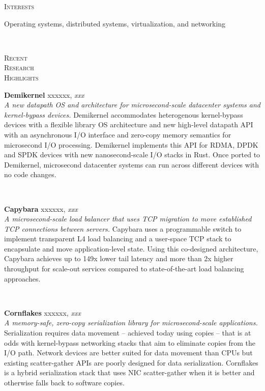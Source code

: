 \documentclass[10pt,times]{report}
\newlength{\sectiongap}
\newlength{\entrygap}
\newlength{\sectioncolwidth}
\newlength{\colgap}
\newlength{\stuffwidth}
\def\ifEqString#1#2{\def\testa{#1}\def\testb{#2}%
  \ifx\testa\testb}
\newenvironment{rtable}{
  \begin{minipage}{\textwidth}
  }{
  \end{minipage}
}
\newenvironment{rentry}[3][xxx]{
  \begin{minipage}[t]{\hsize}
    \textbf{#2}\ifEqString{#1}{xxx}\relax\else, \textit{#1}\fi
    \hspace{\stretch{1}} #3 \\
  }{
    \removelastskip
  \end{minipage}
  \\[\entrygap]  %
}
\newenvironment{rsection}[1]{
  \begin{minipage}[t]{\sectioncolwidth}
    \textsc{#1}
  \end{minipage}
  \hspace{\colgap}
  \begin{minipage}[t]{\stuffwidth}
  }{
    \removelastskip
  \end{minipage}
  \\[\sectiongap]
}
\begin{document}
\begin{rtable}
  \begin{rsection}{Interests}
    Operating systems, distributed systems, virtualization, and networking
  \end{rsection}
  
  \begin{rsection}{Recent\\Research\\Highlights}
    \begin{rentry}{Demikernel}{}
      \textit{A new datapath OS and architecture for
      microsecond-scale datacenter systems and kernel-bypass
      devices.} Demikernel accommodates heterogenous kernel-bypass
      devices with a flexible library OS architecture and new
      high-level datapath API with an asynchronous I/O interface and
      zero-copy memory semantics for microsecond I/O
      processing. Demikernel implements this API for RDMA, DPDK and
      SPDK devices with new nanosecond-scale I/O stacks in Rust. Once
      ported to Demikernel, microsecond datacenter systems can run
      across different devices with no code changes.
    \end{rentry}

\begin{rentry}{Capybara}{}
  \textit{A microsecond-scale load balancer that uses TCP
  migration to move established TCP connections between
  servers.} Capybara uses a programmable switch to implement
  transparent L4 load balancing and a user-space TCP stack to
  encapsulate and move application-level state. Using this co-designed
  architecture, Capybara achieves up to 149x lower tail latency and
  more than 2x higher throughput for scale-out services compared to
  state-of-the-art load balancing approaches.
    \end{rentry}
    
    \begin{rentry}{Cornflakes}{}
      \textit{A memory-safe, zero-copy serialization library for
        microsecond-scale applications.} Serialization requires data
      movement -- achieved today using copies -- that is at odds with
      kernel-bypass networking stacks that aim to eliminate copies
      from the I/O path.  Network devices are better suited for data
      movement than CPUs but existing scatter-gather APIs are poorly
      designed for data serialization.  Cornflakes is a hybrid
      serialization stack that uses NIC scatter-gather when it is
      better and otherwise falls back to software copies.
    \end{rentry}


\end{rsection}
\end{rtable}
\end{document}
